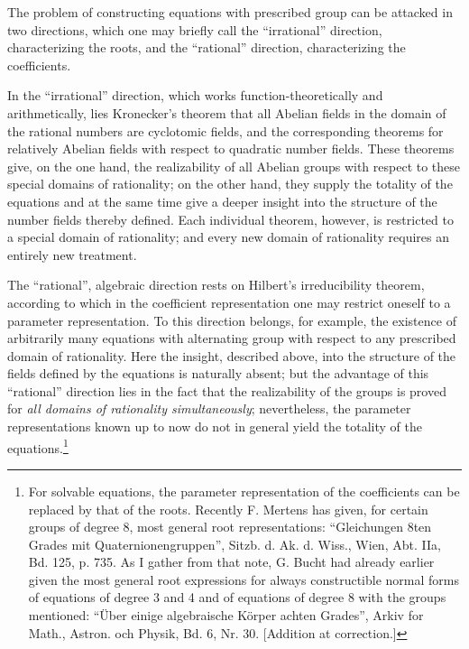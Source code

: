 \documentclass[11pt]{article}
\begin{document}
The problem of constructing equations with prescribed group can be attacked in two directions, which one may briefly call the ``irrational'' direction, characterizing the roots, and the ``rational'' direction, characterizing the coefficients.

In the ``irrational'' direction, which works function-theoretically and arithmetically, lies Kronecker's theorem that all Abelian fields in the domain of the rational numbers are cyclotomic fields, and the corresponding theorems for relatively Abelian fields with respect to quadratic number fields. These theorems give, on the one hand, the realizability of all Abelian groups with respect to these special domains of rationality; on the other hand, they supply the totality of the equations and at the same time give a deeper insight into the structure of the number fields thereby defined. Each individual theorem, however, is restricted to a special domain of rationality; and every new domain of rationality requires an entirely new treatment.

The ``rational'', algebraic direction rests on Hilbert's irreducibility theorem, according to which in the coefficient representation one may restrict oneself to a parameter representation. To this direction belongs, for example, the existence of arbitrarily many equations with alternating group with respect to any prescribed domain of rationality. Here the insight, described above, into the structure of the fields defined by the equations is naturally absent; but the advantage of this ``rational'' direction lies in the fact that the realizability of the groups is proved for \emph{all domains of rationality simultaneously}; nevertheless, the parameter representations known up to now do not in general yield the totality of the equations.\footnote{For solvable equations, the parameter representation of the coefficients can be replaced by that of the roots. Recently F. Mertens has given, for certain groups of degree 8, most general root representations: ``Gleichungen 8ten Grades mit Quaternionengruppen'', Sitzb. d. Ak. d. Wiss., Wien, Abt. IIa, Bd. 125, p. 735. As I gather from that note, G. Bucht had already earlier given the most general root expressions for always constructible normal forms of equations of degree 3 and 4 and of equations of degree 8 with the groups mentioned: ``Über einige algebraische Körper achten Grades'', Arkiv for Math., Astron. och Physik, Bd. 6, Nr. 30. [Addition at correction.]} 
\end{document}
